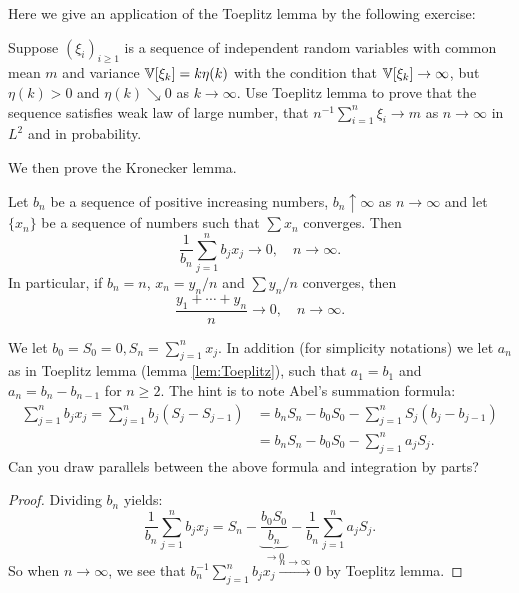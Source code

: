 Here we give an application of the Toeplitz lemma by the following exercise:
\begin{exercise}
Suppose $(\xi_i)_{i\geq 1}$ is a sequence of independent random variables with common mean $m$ and variance $\mathbb{V}[\xi_k] = k\eta(k)$ with the condition that $\mathbb{V}[\xi_k] \to \infty$, but $\eta(k) > 0$ and $\eta(k) \searrow 0$ as $k \to \infty$. Use Toeplitz lemma to prove that the sequence satisfies weak law of large number, that $n^{-1} \sum_{i=1}^n \xi_i \to m$ as $n \to \infty$ in $L^2$ and in probability.
\end{exercise}

We then prove the Kronecker lemma.
\begin{lemma}[Kronecker]
Let $b_n$ be a sequence of positive increasing numbers, $b_n \uparrow \infty$ as $n \to \infty$ and let $\{x_n\}$ be a sequence of numbers such that $\sum x_n$ converges. Then 
\begin{equation*}
    \frac{1}{b_n}\sum_{j=1}^n b_j x_j \to 0, \quad n \to \infty.
\end{equation*}
In particular, if $b_n = n$, $x_n = y_n/n$ and $\sum y_n/n$ converges, then 
\begin{equation*}
    \frac{y_1 + \cdots + y_n}{n} \to 0, \quad n \to \infty.
\end{equation*}
\end{lemma}

\begin{hint}
We let $b_0 = S_0 = 0, S_n = \sum_{j=1}^n x_j$. In addition (for simplicity notations) we let $a_n$ as in Toeplitz lemma (lemma \ref{lem:Toeplitz}), such that $a_1 = b_1$ and $a_n = b_n - b_{n-1}$ for $n \geq 2$. The hint is to note Abel's summation formula:
\begin{align*}
    \sum_{j=1}^n b_j x_j = \sum_{j=1}^n b_j (S_j - S_{j-1}) &= b_n S_n - b_0 S_0 - \sum_{j=1}^n S_j (b_j - b_{j-1}) \\
    &= b_n S_n - b_0 S_0 - \sum_{j=1}^n a_j S_j.
\end{align*}
Can you draw parallels between the above formula and integration by parts?
\end{hint}

\begin{proof}
Dividing $b_n$ yields:
\begin{equation}
    \frac{1}{b_n} \sum_{j=1}^n b_j x_j = S_n - \underbrace{\frac{b_0 S_0}{b_n}}_{\to 0} - \frac{1}{b_n} \sum_{j=1}^n a_j S_j.
\end{equation}
So when $n\to \infty$, we see that $b_n^{-1} \sum_{j=1}^n b_j x_j \overset{n\to\infty}{\to} 0$ by Toeplitz lemma.
\end{proof}

